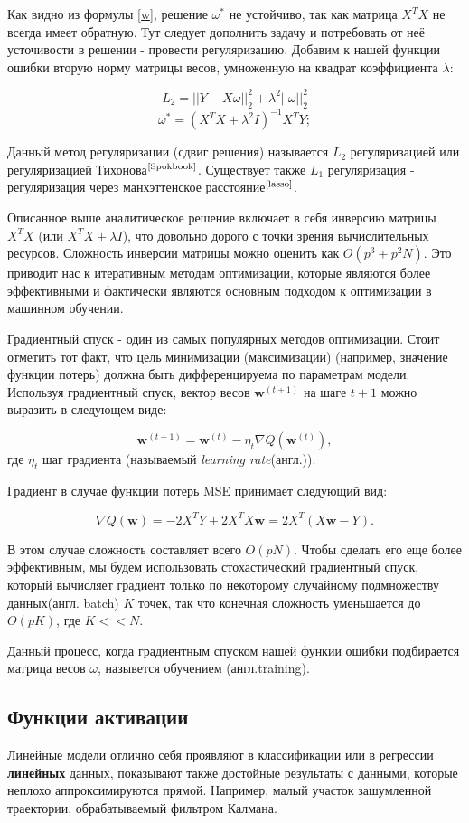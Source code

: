 \documentclass[a4paper,11pt]{article} %
\begin{document}
Как видно из формулы \ref{w}, решение $\omega^*$ не устойчиво, так как матрица  $X^TX$ не всегда имеет обратную.  Тут следует  дополнить  задачу и  потребовать  от неё усточивости  в решении - провести  регуляризацию.  Добавим к нашей функции  ошибки вторую  норму матрицы  весов, умноженную на квадрат коэффициента $\lambda$:

$$L_2=||Y-X\omega||^2_2+\lambda^2||\omega||^2_2$$ 
$$\omega^*=(X^TX+\lambda^2I)^{-1}X^TY;$$

 Данный метод регуляризации (сдвиг решения) называется $L_2$ регуляризацией или регуляризацией Тихонова$^\text{\cite{Spokbook}}$.  Существует также $L_1$  регуляризация - регуляризация через манхэттенское расстояние$^\text{\cite{lasso}}$.  
 
Описанное выше аналитическое решение включает в себя инверсию матрицы $X^T X$ (или $X^T X + \lambda I$), что довольно дорого с точки зрения вычислительных ресурсов. Сложность инверсии матрицы можно оценить как $O (p^3 + p^2 N)$. Это приводит нас к итеративным методам оптимизации, которые являются более эффективными и фактически являются основным подходом к оптимизации в машинном обучении.

Градиентный спуск - один из самых популярных методов оптимизации. Стоит отметить тот факт, что цель минимизации (максимизации) (например, значение функции потерь) должна быть дифференцируема по параметрам модели.  Используя градиентный спуск, вектор весов $\mathbf{w}^{(t+1)}$ на шаге $t+1$ можно выразить в следующем виде:

$$
\mathbf{w}^{(t+1)} = \mathbf{w}^{(t)} - \eta_t \nabla Q(\mathbf{w}^{(t)}),
$$
где $\eta_t$ шаг градиента (называемый \textit{learning rate}(англ.)).

Градиент в случае функции потерь MSE принимает следующий вид:

$$
\nabla Q(\mathbf{w}) = -2X^TY + 2X^TX\mathbf{w} = 2X^T(X\mathbf{w} - Y).
$$

В этом случае сложность составляет всего $O (pN)$. Чтобы сделать его еще более эффективным,  мы будем использовать стохастический градиентный спуск,  который вычисляет градиент только по некоторому случайному подмножеству данных(англ. batch) $K$ точек, так что конечная сложность уменьшается до $O(pK)$, где $K << N$.

Данный процесс,  когда градиентным спуском нашей функии ошибки подбирается матрица весов  $\omega$,  назывется обучением (англ.training).

\subsection{Функции активации}
Линейные модели отлично себя проявляют в классификации или  в регрессии  \textbf{линейных} данных,  показывают также достойные  результаты  с данными,  которые неплохо аппроксимируются прямой.  Например, малый участок зашумленной траектории,  обрабатываемый фильтром Калмана. 
\end{document}
